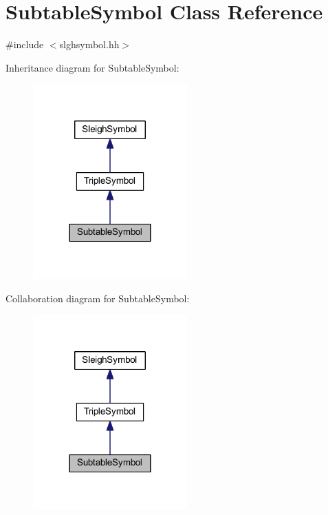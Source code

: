\hypertarget{class_subtable_symbol}{}\section{Subtable\+Symbol Class Reference}
\label{class_subtable_symbol}


{\ttfamily \#include $<$slghsymbol.\+hh$>$}



Inheritance diagram for Subtable\+Symbol\+:
\nopagebreak
\begin{figure}[H]
\begin{center}
\leavevmode
\includegraphics[width=168pt]{class_subtable_symbol__inherit__graph}
\end{center}
\end{figure}


Collaboration diagram for Subtable\+Symbol\+:
\nopagebreak
\begin{figure}[H]
\begin{center}
\leavevmode
\includegraphics[width=168pt]{class_subtable_symbol__coll__graph}
\end{center}
\end{figure}
